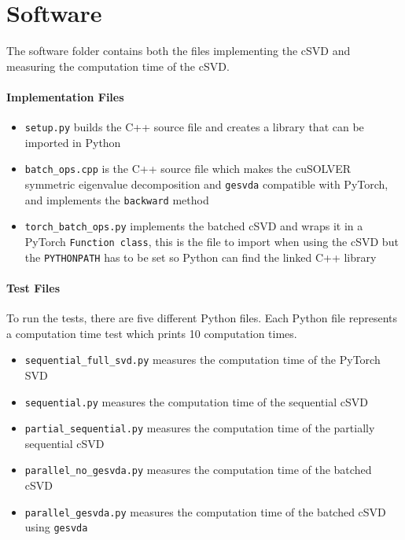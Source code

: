 \chapter{Software}\label{app:software}

The software folder contains both the files implementing the cSVD and measuring the computation time of the cSVD.

\subsubsection*{Implementation Files}

\begin{itemize}
\item \texttt{setup.py} builds the C++ source file and creates a library that can be imported in Python
\item \texttt{batch\_ops.cpp} is the C++ source file which makes the cuSOLVER symmetric eigenvalue decomposition and \texttt{gesvda} compatible with PyTorch, and implements the \texttt{backward} method
\item \texttt{torch\_batch\_ops.py} implements the batched cSVD and wraps it in a PyTorch \texttt{Function class}, this is the file to import when using the cSVD but the \texttt{PYTHONPATH} has to be set so Python can find the linked C++ library
\end{itemize}

\subsubsection*{Test Files}

To run the tests, there are five different Python files. Each Python file represents a computation time test which prints 10 computation times.

\begin{itemize}
\item \texttt{sequential\_full\_svd.py} measures the computation time of the PyTorch SVD
\item \texttt{sequential.py} measures the computation time of the sequential cSVD
\item \texttt{partial\_sequential.py} measures the computation time of the partially sequential cSVD
\item \texttt{parallel\_no\_gesvda.py} measures the computation time of the batched cSVD
\item \texttt{parallel\_gesvda.py} measures the computation time of the batched cSVD using \texttt{gesvda}
\end{itemize}